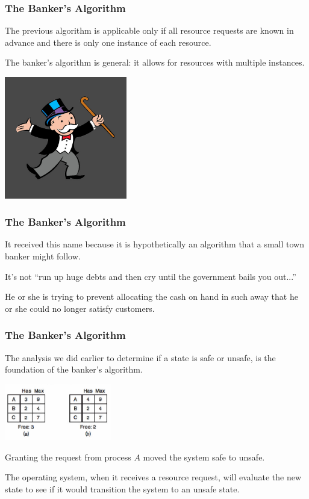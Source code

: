 \begin{frame}
	\frametitle{The Banker's Algorithm}

	The previous algorithm is applicable only if all resource requests are known in advance and there is only one instance of each resource.

	The banker's algorithm is general: it allows for resources with multiple instances.

	\begin{center}
		\includegraphics[width=0.4\textwidth]{images/monopoly-man.jpg}
	\end{center}

\end{frame}


\begin{frame}
	\frametitle{The Banker's Algorithm}


	It received this name because it is hypothetically an algorithm that a small town banker might follow.

	It's not ``run up huge debts and then cry until the government bails you out...''

	He or she is trying to prevent allocating the cash on hand in such away that he or she could no longer satisfy customers.

\end{frame}

\begin{frame}
	\frametitle{The Banker's Algorithm}


	The analysis we did earlier to determine if a state is safe or unsafe, is the foundation of the banker's algorithm.

	\begin{center}
		\includegraphics[width=0.35\textwidth]{images/unsafe-state-initial.png}
	\end{center}

	Granting the request from process $A$ moved the system safe to unsafe.

	The operating system, when it receives a resource request, will evaluate the new state to see if it would transition the system to an unsafe state.

\end{frame}

